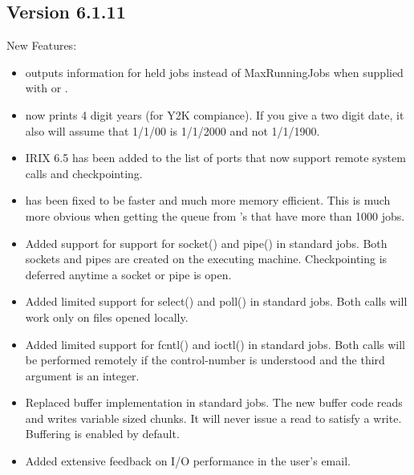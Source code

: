 \subsection{\label{sec:New-6-1-11}Version 6.1.11}

\noindent New Features:

\begin{itemize}

\item {} outputs information for held jobs instead of
MaxRunningJobs when supplied with  or .

\item {} now prints 4 digit years (for Y2K compiance). 
If you give a two digit date, it also will assume that 1/1/00 is 1/1/2000
and not 1/1/1900.

\item IRIX 6.5 has been added to the list of ports that now support
remote system calls and checkpointing.

\item {} has been fixed to be faster and much more memory
efficient.  This is much more obvious when getting the queue from
's that have more than 1000 jobs.

\item Added support for support for socket() and pipe() in standard
jobs.  Both sockets and pipes are created on the executing machine.
Checkpointing is deferred anytime a socket or pipe is open.

\item Added limited support for select() and poll() in standard jobs.
Both calls will work only on files opened locally.

\item Added limited support for fcntl() and ioctl() in standard jobs.
Both calls will be performed remotely if the control-number is understood
and the third argument is an integer.

\item Replaced buffer implementation in standard jobs.
The new buffer code reads and writes variable sized chunks.
It will never issue a read to satisfy a write.  Buffering is enabled
by default.

\item Added extensive feedback on I/O performance in the user's email.


\end{itemize}
